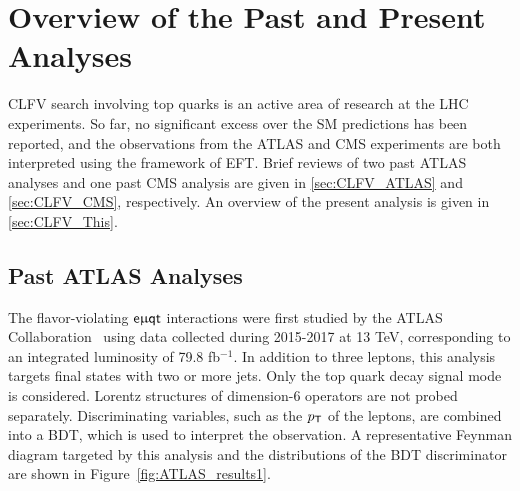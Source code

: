 \chapter{Overview of the Past and Present Analyses}
\label{chap:History}

\ac{CLFV} search involving top quarks is an active area of research at the \ac{LHC} experiments. So far, no significant excess over the \ac{SM} predictions has been reported, and the observations from the \ac{ATLAS} and \ac{CMS} experiments are both interpreted using the framework of \ac{EFT}. Brief reviews of two past \ac{ATLAS} analyses and one past \ac{CMS} analysis are given in \autoref{sec:CLFV_ATLAS} and \autoref{sec:CLFV_CMS}, respectively. An overview of the present analysis is given in \autoref{sec:CLFV_This}.

\section{Past ATLAS Analyses}
\label{sec:CLFV_ATLAS}

The flavor-violating $\textsf{e}\upmu\textsf{{q}t}$ interactions were first studied by the \ac{ATLAS} Collaboration~\cite{ATLAS-CONF-2018-044} using data collected during 2015-2017 at 13 TeV, corresponding to an integrated luminosity of 79.8 fb$^{-1}$. In addition to three leptons, this analysis targets final states with two or more jets. Only the top quark decay signal mode is considered. Lorentz structures of dimension-6 operators are not probed separately. Discriminating variables, such as the $p_{\textsf{T}}$ of the leptons, are combined into a \ac{BDT}, which is used to interpret the observation. A representative Feynman diagram targeted by this analysis and the distributions of the \ac{BDT} discriminator are shown in Figure~\ref{fig:ATLAS_results1}.

